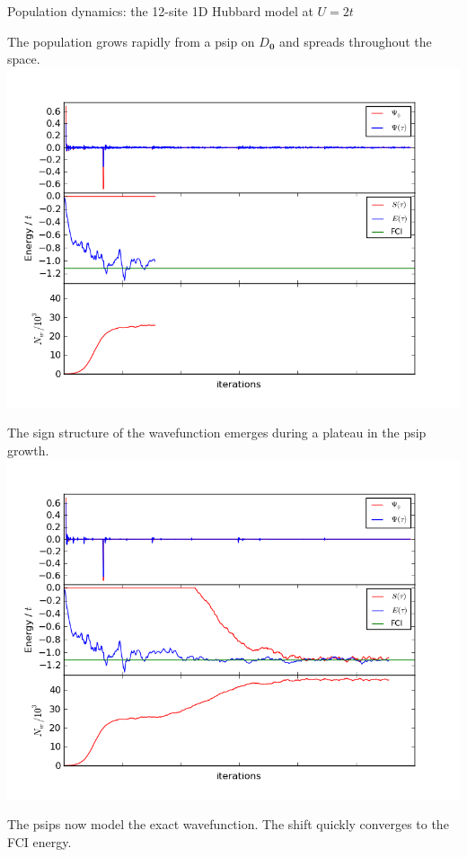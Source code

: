 \documentclass[final]{beamer} %
\newcommand{\Dz}{D_\mathbf{0}}
\begin{document}
\begin{frame}[t]
\begin{columns}[t]
\begin{column}{0.9\paperwidth}
\begin{block}{Population dynamics: the 12-site 1D Hubbard model at $U=2t$}
\begin{multicols}{4}
          The population grows rapidly from a psip on \columnbreak $\Dz$ and spreads throughout the space.
          \includegraphics[width=0.95\linewidth]{step155}

          The sign structure of the wavefunction emerges \columnbreak during a plateau in the psip growth.
          \includegraphics[width=0.95\linewidth]{step555}

          The psips now model the exact wavefunction.  The \columnbreak shift quickly converges to the FCI energy.


\end{multicols}
\end{block}
\end{column}
\end{columns}
\end{frame}
\end{document}
